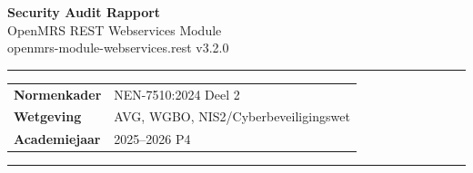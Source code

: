 \documentclass[12pt, a4paper]{report}
\begin{document}
\begin{titlepage}

    \noindent
    \colorbox{avansRed}{%
        \parbox[t][3.5cm]{\paperwidth}{%
            \vfill
            \vspace{0.6cm}
        }%
    }

    \vspace{2.5cm}
    \hspace{2.5cm}%
    \begin{minipage}[t]{14cm}

        {\fontsize{36}{42}\selectfont\bfseries\color{avansRed}
            Security Audit Rapport}\\[0.5cm]

        {\fontsize{18}{22}\selectfont\color{avansDark}
            OpenMRS REST Webservices Module}\\[0.2cm]

        {\large\ttfamily\color{avansGray}
            openmrs-module-webservices.rest v3.2.0}

        \vspace{0.7cm}
        {\color{avansRed}\rule{14cm}{1.5pt}}
        \vspace{0.6cm}

        \begin{tabular}{@{}ll}
            \textbf{Normenkader}      & NEN-7510:2024 Deel 2 \\[4pt]
            \textbf{Wetgeving}        & AVG, WGBO, NIS2/Cyberbeveiligingswet \\[4pt]
            \textbf{Academiejaar}     & 2025--2026 P4 \\[4pt]
        \end{tabular}

        \vspace{0.6cm}
        {\color{avansRed}\rule{14cm}{1.5pt}}
        \vspace{0.6cm}


\end{minipage}
\end{titlepage}
\end{document}
